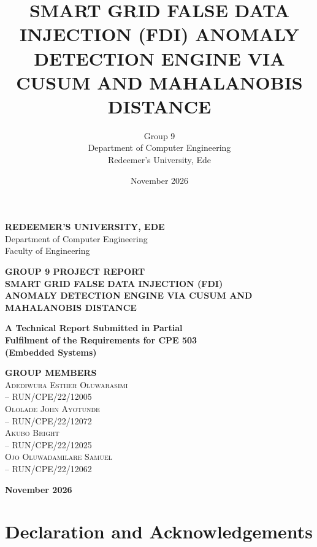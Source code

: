 \documentclass[11pt,a4paper]{report}
\title{\textbf{SMART GRID FALSE DATA INJECTION (FDI) ANOMALY DETECTION ENGINE VIA CUSUM AND MAHALANOBIS DISTANCE}}
\author{Group 9\\Department of Computer Engineering\\Redeemer's University, Ede}
\date{November 2026}
\begin{document}
\begin{titlepage}
\centering
\vspace*{1cm}
{\Large\textbf{REDEEMER'S UNIVERSITY, EDE}}\\[0.4cm]
{\large Department of Computer Engineering}\\
{\large Faculty of Engineering}

\vspace{1.5cm}
{\Large\textbf{GROUP 9 PROJECT REPORT}}\\[1cm]

{\LARGE\textbf{
SMART GRID FALSE DATA INJECTION (FDI)\\
ANOMALY DETECTION ENGINE VIA CUSUM AND\\
MAHALANOBIS DISTANCE
}}

\vspace{1.5cm}
\textbf{A Technical Report Submitted in Partial\\
Fulfilment of the Requirements for CPE 503\\
(Embedded Systems)}

\vspace{1.5cm}
\textbf{GROUP MEMBERS}\\[0.5cm]

\textsc{Adediwura Esther Oluwarasimi}\\
-- RUN/CPE/22/12005\\[0.3cm]

\textsc{Ololade John Ayotunde}\\
-- RUN/CPE/22/12072\\[0.3cm]

\textsc{Akubo Bright}\\
-- RUN/CPE/22/12025\\[0.3cm]

\textsc{Ojo Oluwadamilare Samuel}\\
-- RUN/CPE/22/12062

\vfill
\textbf{November 2026}
\end{titlepage}


\chapter*{Declaration and Acknowledgements}
\end{document}
